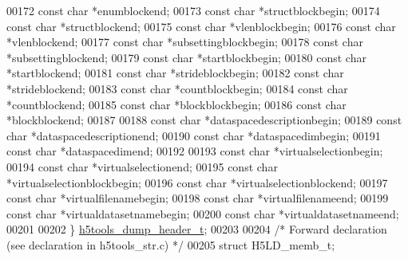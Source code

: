 \begin{DoxyCode}
{00172     \textcolor{keyword}{const} \textcolor{keywordtype}{char} *enumblockend;
00173     \textcolor{keyword}{const} \textcolor{keywordtype}{char} *structblockbegin;
00174     \textcolor{keyword}{const} \textcolor{keywordtype}{char} *structblockend;
00175     \textcolor{keyword}{const} \textcolor{keywordtype}{char} *vlenblockbegin;
00176     \textcolor{keyword}{const} \textcolor{keywordtype}{char} *vlenblockend;
00177     \textcolor{keyword}{const} \textcolor{keywordtype}{char} *subsettingblockbegin;
00178     \textcolor{keyword}{const} \textcolor{keywordtype}{char} *subsettingblockend;
00179     \textcolor{keyword}{const} \textcolor{keywordtype}{char} *startblockbegin;
00180     \textcolor{keyword}{const} \textcolor{keywordtype}{char} *startblockend;
00181     \textcolor{keyword}{const} \textcolor{keywordtype}{char} *strideblockbegin;
00182     \textcolor{keyword}{const} \textcolor{keywordtype}{char} *strideblockend;
00183     \textcolor{keyword}{const} \textcolor{keywordtype}{char} *countblockbegin;
00184     \textcolor{keyword}{const} \textcolor{keywordtype}{char} *countblockend;
00185     \textcolor{keyword}{const} \textcolor{keywordtype}{char} *blockblockbegin;
00186     \textcolor{keyword}{const} \textcolor{keywordtype}{char} *blockblockend;
00187 
00188     \textcolor{keyword}{const} \textcolor{keywordtype}{char} *dataspacedescriptionbegin;
00189     \textcolor{keyword}{const} \textcolor{keywordtype}{char} *dataspacedescriptionend;
00190     \textcolor{keyword}{const} \textcolor{keywordtype}{char} *dataspacedimbegin;
00191     \textcolor{keyword}{const} \textcolor{keywordtype}{char} *dataspacedimend;
00192 
00193     \textcolor{keyword}{const} \textcolor{keywordtype}{char} *virtualselectionbegin;
00194     \textcolor{keyword}{const} \textcolor{keywordtype}{char} *virtualselectionend;
00195     \textcolor{keyword}{const} \textcolor{keywordtype}{char} *virtualselectionblockbegin;
00196     \textcolor{keyword}{const} \textcolor{keywordtype}{char} *virtualselectionblockend;
00197     \textcolor{keyword}{const} \textcolor{keywordtype}{char} *virtualfilenamebegin;
00198     \textcolor{keyword}{const} \textcolor{keywordtype}{char} *virtualfilenameend;
00199     \textcolor{keyword}{const} \textcolor{keywordtype}{char} *virtualdatasetnamebegin;
00200     \textcolor{keyword}{const} \textcolor{keywordtype}{char} *virtualdatasetnameend;
00201 
00202 \} \hyperlink{structh5tools__dump__header__t}{h5tools\_dump\_header\_t};
00203 
00204 \textcolor{comment}{/* Forward declaration (see declaration in h5tools\_str.c) */}
00205 \textcolor{keyword}{struct }H5LD\_memb\_t;
}
\end{DoxyCode}
